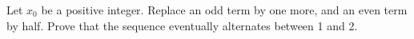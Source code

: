 Let $x_0$ be a positive integer. Replace an odd term by one more, and an even term by half. Prove that the sequence eventually alternates between 1 and 2.
